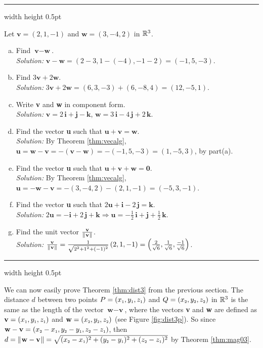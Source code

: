 \hrule width \textwidth height 0.5pt
\begin{exmp}
 Let $\textbf{v} = (2,1,-1)$ and $\textbf{w} = (3,-4,2)$ in $\mathbb{R}^{3}$.
 \begin{enumerate}[(a)]
  \item Find $\textbf{v} - \textbf{w}$.\\\emph{Solution:} $\textbf{v} - \textbf{w} =
   (2 - 3,1 - (-4), -1 - 2) = (-1,5,-3)$.
  \item Find $3\textbf{v} + 2\textbf{w}$.\\\emph{Solution:} $3\textbf{v} + 2\textbf{w} = (6,3,-3) + (6,-8,4) =
   (12,-5,1)$.
  \item Write \textbf{v} and \textbf{w} in component form.\\\emph{Solution:}
   $\textbf{v} = 2\,\textbf{i} + \textbf{j} - \textbf{k}$, $\textbf{w} = 3\,\textbf{i} - 4\,\textbf{j} + 2\,\textbf{k}$.
  \item Find the vector \textbf{u} such that $\textbf{u} + \textbf{v} = \textbf{w}$.\\\emph{Solution:} By Theorem
   \ref{thm:vecalg}, $\textbf{u} = \textbf{w} - \textbf{v} = -(\textbf{v} - \textbf{w}) = -(-1,5,-3) = (1,-5,3)$, by
   part(a).
  \item Find the vector \textbf{u} such that $\textbf{u} + \textbf{v} + \textbf{w} = \textbf{0}$.\\\emph{Solution:}
   By Theorem \ref{thm:vecalg}, $\textbf{u} = -\textbf{w} - \textbf{v} = -(3,-4,2) - (2,1,-1) = (-5,3,-1)$.
  \item Find the vector \textbf{u} such that $2\textbf{u} + \textbf{i} - 2\,\textbf{j} = \textbf{k}$.\\\emph{Solution:}
   $2\textbf{u} = -\textbf{i} + 2\,\textbf{j} + \textbf{k} \Longrightarrow \textbf{u} = -\frac{1}{2}\,\textbf{i} +
  \textbf{j} + \frac{1}{2}\,\textbf{k}$.
  \item Find the unit vector $\frac{\textbf{v}}{\lVert\mspace{1mu}\textbf{v}\mspace{1mu}\rVert}$.\\\emph{Solution:}
   $\frac{\textbf{v}}{\lVert\mspace{1mu}\textbf{v}\mspace{1mu}\rVert} = \frac{1}{\sqrt{2^2 + 1^2 + (-1)^2}} \,(2,1,-1) =
   \left ( \frac{2}{\sqrt{6}},\frac{1}{\sqrt{6}},\frac{-1}{\sqrt{6}} \right )$.
 \end{enumerate} 
\end{exmp}
\hrule width \textwidth height 0.5pt

We can now easily prove Theorem \ref{thm:dist3} from the previous section. The distance $d$ between two
points $P = (x_{\scriptscriptstyle 1},y_{\scriptscriptstyle 1},z_{\scriptscriptstyle 1})$ and $Q = (x_{\scriptscriptstyle 2},y_{\scriptscriptstyle 2},z_{\scriptscriptstyle 2})$ in $\mathbb{R}^{3}$ is the
same as the length of the vector $\textbf{w} - \textbf{v}$, where the vectors \textbf{v} and \textbf{w} are
defined as $\textbf{v} = (x_{\scriptscriptstyle 1},y_{\scriptscriptstyle 1},z_{\scriptscriptstyle 1})$
and $\textbf{w} = (x_{\scriptscriptstyle 2},y_{\scriptscriptstyle 2},z_{\scriptscriptstyle 2})$ (see Figure \ref{fig:dist3p}). So since $\textbf{w} -
\textbf{v} = (x_{\scriptscriptstyle 2} - x_{\scriptscriptstyle 1},y_{\scriptscriptstyle 2} - y_{\scriptscriptstyle 1},z_{\scriptscriptstyle 2} - z_{\scriptscriptstyle 1})$, then
$d = \lVert\mspace{1mu}\textbf{w} - \textbf{v}\mspace{1mu}\rVert = \sqrt{(x_{\scriptscriptstyle 2} - x_{\scriptscriptstyle 1})^2 + (y_{\scriptscriptstyle 2} - y_{\scriptscriptstyle 1})^2 +
(z_{\scriptscriptstyle 2} - z_{\scriptscriptstyle 1})^2}$ by Theorem \ref{thm:mag03}.

